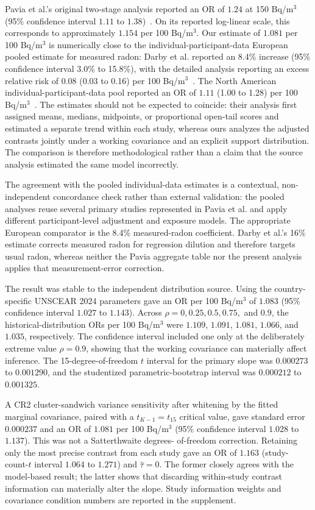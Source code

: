 \documentclass[journal=rsm]{CUP-JNL-DTM}%
\theoremstyle{definition}
\numberwithin{equation}{section}
\begin{document}
Pavia et al.'s original two-stage analysis reported an OR of $1.24$ at
150 Bq/m$^3$ (95\% confidence interval $1.11$ to $1.38$)~\cite{Pavia2003}.
On its reported log-linear scale, this corresponds to approximately $1.154$
per 100 Bq/m$^3$. Our estimate of $1.081$ per 100 Bq/m$^3$ is numerically close
to the individual-participant-data European pooled estimate for measured radon:
Darby et al. reported an 8.4\% increase (95\% confidence interval 3.0\% to
15.8\%), with the detailed analysis reporting an excess relative risk of 0.08
(0.03 to 0.16) per 100 Bq/m$^3$~\cite{Darby2005,Darby2006}. The North American
individual-participant-data pool reported an OR of $1.11$ (1.00 to 1.28) per
100 Bq/m$^3$~\cite{Krewski2005}.
The estimates should not be expected to coincide: their analysis first assigned
means, medians, midpoints, or proportional open-tail scores and estimated a
separate trend within each study, whereas ours analyzes the adjusted contrasts
jointly under a working covariance and an explicit support distribution. The
comparison is therefore methodological rather than a claim that the source
analysis estimated the same model incorrectly.

The agreement with the pooled individual-data estimates is a contextual,
non-independent concordance check rather than external validation: the pooled
analyses reuse several primary studies represented in Pavia et al. and apply
different participant-level adjustment and exposure models. The appropriate
European comparator is the 8.4\% measured-radon coefficient. Darby et al.'s
16\% estimate corrects measured radon for regression dilution and therefore
targets usual radon, whereas neither the Pavia aggregate table nor the present
analysis applies that measurement-error correction.

The result was stable to the independent distribution source. Using the
country-specific UNSCEAR 2024 parameters gave an OR per 100 Bq/m$^3$ of $1.083$
(95\% confidence interval $1.027$ to $1.143$). Across $\rho=0,0.25,0.5,0.75,$
and $0.9$, the historical-distribution ORs per 100 Bq/m$^3$ were $1.109$,
$1.091$, $1.081$, $1.066$, and $1.035$, respectively. The confidence interval
included one only at the deliberately extreme value $\rho=0.9$, showing that
the working covariance can materially affect inference. The 15-degree-of-freedom
$t$ interval for the primary slope was $0.000273$ to $0.001290$, and the
studentized parametric-bootstrap interval was $0.000212$ to $0.001325$.

A CR2 cluster-sandwich variance sensitivity after whitening by the fitted
marginal covariance, paired with a $t_{K-1}=t_{15}$ critical value, gave
standard error $0.000237$ and an OR of $1.081$ per 100 Bq/m$^3$ (95\%
confidence interval $1.028$ to $1.137$). This was not a Satterthwaite degrees-
of-freedom correction. Retaining only the most precise contrast from each study
gave an OR of $1.163$ (study-count-$t$ interval $1.064$ to $1.271$) and
$\hat\tau=0$. The former closely agrees with the model-based result; the latter
shows that discarding within-study contrast information can materially alter
the slope. Study information weights and covariance condition numbers are
reported in the supplement.
\end{document}
